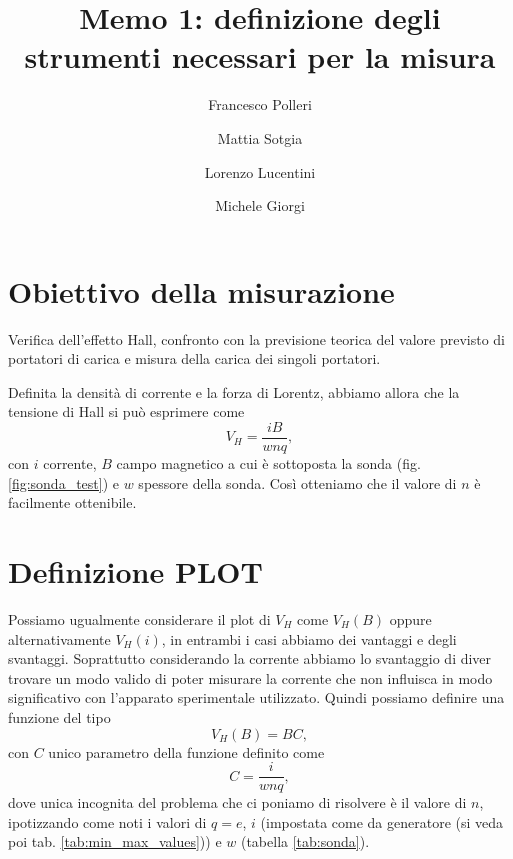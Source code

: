 \documentclass[fleqn,varvw,11pt,tightenlines]{memo}
\begin{document}
\title{Memo 1: definizione degli strumenti necessari per la misura}

\author{Francesco Polleri}
\author{Mattia Sotgia}


\author{Lorenzo Lucentini}
\author{Michele Giorgi}

\revised{\today}

\begin{abstract}

\end{abstract}
\maketitle

\section{Obiettivo della misurazione}

Verifica dell'effetto Hall, confronto con la previsione teorica del valore previsto di portatori di carica e misura della carica dei singoli portatori.

Definita la densità di corrente e la forza di Lorentz, abbiamo allora che la tensione di Hall si può esprimere come \begin{equation}
    V_H = \frac{iB}{wnq},
\end{equation} con $i$ corrente, $B$ campo magnetico a cui è sottoposta la sonda (fig. \ref{fig:sonda_test}) e $w$ spessore della sonda. Così otteniamo che il valore di $n$ è facilmente ottenibile. 



\section{Definizione PLOT}

Possiamo ugualmente considerare il plot di $V_H$ come $V_H(B)$ oppure alternativamente $V_H(i)$, in entrambi i casi abbiamo dei vantaggi e degli svantaggi. Soprattutto considerando la corrente abbiamo lo svantaggio di diver trovare un modo valido di poter misurare la corrente che non influisca in modo significativo con l'apparato sperimentale utilizzato. 
Quindi possiamo definire una funzione del tipo \begin{equation}
    V_H(B) = BC,
\end{equation} con $C$ unico parametro della funzione definito come \begin{equation}
    C=\frac{i}{wnq},
\end{equation} dove unica incognita del problema che ci poniamo di risolvere è il valore di $n$, ipotizzando come noti i valori di $q=e$, $i$ (impostata come da generatore (si veda poi tab. \ref{tab:min_max_values})) e $w$ (tabella \ref{tab:sonda}).
\end{document}
